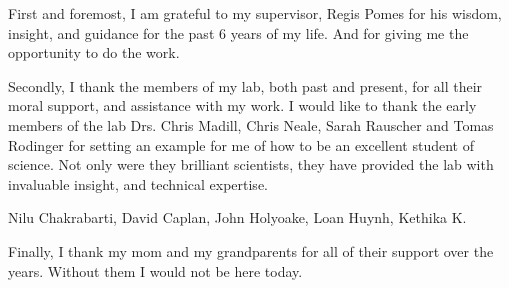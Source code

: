 First and foremost, I am grateful to my supervisor, Regis Pomes for his wisdom, insight, and guidance for the past 6 years of my life. And for giving me the opportunity to do the work.


Secondly, I thank the members of my lab, both past and present, for all their moral support, and assistance with my work. 
I would like to thank the early members of the lab Drs. Chris Madill, Chris Neale, Sarah Rauscher and Tomas Rodinger for setting an example for me of how to be an excellent student of science. Not only were they brilliant scientists, they have provided the lab with invaluable insight, and technical expertise.

Nilu Chakrabarti, David Caplan, John Holyoake, Loan Huynh, Kethika K.





Finally, I thank my mom and my grandparents for all of their support over the years. Without them I would not be here today.
